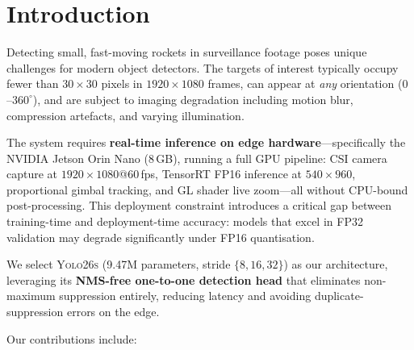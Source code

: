 \documentclass[12pt, titlepage]{article}
\begin{document}
\newpage
{}

\section{Introduction}
\label{sec:intro}

Detecting small, fast-moving rockets in surveillance footage poses unique
challenges for modern object detectors. The targets of interest typically
occupy fewer than $30{\times}30$ pixels in $1920{\times}1080$ frames, can
appear at \emph{any} orientation ($0$--$360^{\circ}$), and are subject to
imaging degradation including motion blur, compression artefacts, and varying
illumination.

The \progname{} system requires \textbf{real-time inference on edge
  hardware}---specifically the NVIDIA Jetson Orin Nano (8\,GB), running a full
GPU pipeline: CSI camera capture at $1920{\times}1080$@60\,fps, TensorRT FP16
inference at $540{\times}960$, proportional gimbal tracking, and GL shader live
zoom---all without CPU-bound post-processing. This deployment constraint
introduces a critical gap between training-time and deployment-time accuracy:
models that excel in FP32 validation may degrade significantly under FP16
quantisation.

We select \textsc{Yolo26s} (9.47M parameters, stride $\{8, 16, 32\}$) as our
architecture, leveraging its \textbf{NMS-free one-to-one detection head} that
eliminates non-maximum suppression entirely, reducing latency and avoiding
duplicate-suppression errors on the edge.

\noindent Our contributions include:
\end{document}
